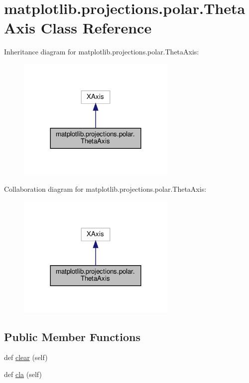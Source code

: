 \hypertarget{classmatplotlib_1_1projections_1_1polar_1_1ThetaAxis}{}\section{matplotlib.\+projections.\+polar.\+Theta\+Axis Class Reference}
\label{classmatplotlib_1_1projections_1_1polar_1_1ThetaAxis}


Inheritance diagram for matplotlib.\+projections.\+polar.\+Theta\+Axis\+:
\nopagebreak
\begin{figure}[H]
\begin{center}
\leavevmode
\includegraphics[width=216pt]{classmatplotlib_1_1projections_1_1polar_1_1ThetaAxis__inherit__graph}
\end{center}
\end{figure}


Collaboration diagram for matplotlib.\+projections.\+polar.\+Theta\+Axis\+:
\nopagebreak
\begin{figure}[H]
\begin{center}
\leavevmode
\includegraphics[width=216pt]{classmatplotlib_1_1projections_1_1polar_1_1ThetaAxis__coll__graph}
\end{center}
\end{figure}
\subsection*{Public Member Functions}
\begin{DoxyCompactItemize}
\item 
def \hyperlink{classmatplotlib_1_1projections_1_1polar_1_1ThetaAxis_af5f65f4cda980738897177feb65f67c7}{clear} (self)
\item 
def \hyperlink{classmatplotlib_1_1projections_1_1polar_1_1ThetaAxis_a3bab80a709f62d50a601515ee00394d4}{cla} (self)
\end{DoxyCompactItemize}
